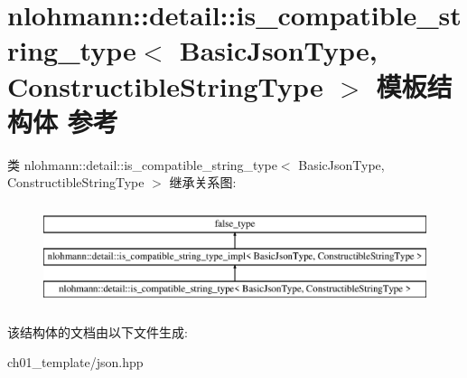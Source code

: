 \hypertarget{structnlohmann_1_1detail_1_1is__compatible__string__type}{}\section{nlohmann\+::detail\+::is\+\_\+compatible\+\_\+string\+\_\+type$<$ Basic\+Json\+Type, Constructible\+String\+Type $>$ 模板结构体 参考}
\label{structnlohmann_1_1detail_1_1is__compatible__string__type}
类 nlohmann\+::detail\+::is\+\_\+compatible\+\_\+string\+\_\+type$<$ Basic\+Json\+Type, Constructible\+String\+Type $>$ 继承关系图\+:\begin{figure}[H]
\begin{center}
\leavevmode
\includegraphics[height=3.000000cm]{structnlohmann_1_1detail_1_1is__compatible__string__type}
\end{center}
\end{figure}


该结构体的文档由以下文件生成\+:\begin{DoxyCompactItemize}
\item 
ch01\+\_\+template/json.\+hpp\end{DoxyCompactItemize}
